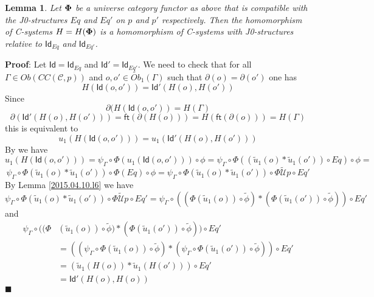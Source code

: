 \documentclass[12pt]{article}
\numberwithin{equation}{section}
\newenvironment{myproof}{{\bf Proof}:}{$\blacksquare$ \vskip 5mm }
\newtheorem{lemma}[proposition]{Lemma}
\newcommand{\wt}{\widetilde}
\newcommand{\toCC}{CC} %
\newcommand{\C}{{\mathcal C}}  %
\newcommand{\ft}{\mathsf{ft}}
\newcommand{\Id}{\mathsf{Id}} %
\newcommand{\U}{\mathcal{U}}
\newcommand{\Obwt}{\wt{Ob}}
\begin{document}
\begin{lemma}
\label{2015.04.12.l1} Let ${\bf\Phi}$ be a universe category functor as above
that is compatible with the J0-structures $Eq$ and $Eq'$ on $p$ and $p'$
respectively. Then the homomorphism of C-systems $H=H({\bf\Phi})$ is a
homomorphism of C-systems with J0-structures relative to $\Id_{Eq}$ and
$\Id_{Eq'}$.
\end{lemma}
%
\begin{myproof}
Let $\Id=\Id_{Eq}$ and $\Id'=\Id_{Eq'}$. We need to check that for all
$\Gamma\in Ob(\toCC({\C},p))$ and $o,o'\in \Obwt_1(\Gamma)$ such that
$\partial(o)=\partial(o')$ one has
%
$$H(\Id(o,o'))=\Id'(H(o),H(o'))$$
%
Since
%
$$\partial(H(\Id(o,o'))=H(\Gamma)$$
%
$$\partial(\Id'(H(o),H(o')))=\ft(\partial(H(o)))=H(\ft(\partial(o)))=H(\Gamma)$$
%
this is equivalent to
%
$$u_1(H(\Id(o,o')))=u_1(\Id'(H(o),H(o')))$$
%
By \cite[Lemma 6.1(1)]{fromunivwithPi} we have
%
$$u_1(H(\Id(o,o')))=\psi_{\Gamma}\circ\Phi(u_1(\Id(o,o')))\circ\phi=\psi_{\Gamma}\circ\Phi((\wt{u}_1(o)*\wt{u}_1(o'))\circ
Eq)\circ\phi=$$
%
$$\psi_{\Gamma}\circ\Phi(\wt{u}_1(o)*\wt{u}_1(o'))\circ
\Phi(Eq)\circ\phi=\psi_{\Gamma}\circ\Phi(\wt{u}_1(o)*\wt{u}_1(o'))\circ
\Phi\wt{\U}p\circ Eq'$$
%
By Lemma \ref{2015.04.10.l6} we have
%
$$\psi_{\Gamma}\circ\Phi(\wt{u}_1(o)*\wt{u}_1(o'))\circ \Phi\wt{\U}p\circ
Eq'=\psi_{\Gamma}\circ((\Phi(\wt{u}_1(o))\circ\wt{\phi})*(\Phi(\wt{u}_1(o'))\circ\wt{\phi}))\circ
Eq'$$
%
and \cite[Lemma 6.1(2)]{fromunivwithPi}
%
\begin{align*}
  \psi_{\Gamma}\circ((\Phi&(\wt{u}_1(o))\circ\wt{\phi})*(\Phi(\wt{u}_1(o'))\circ\wt{\phi}))\circ Eq' \\
    & = ((\psi_{\Gamma}\circ\Phi(\wt{u}_1(o))\circ\wt{\phi})*(\psi_{\Gamma}\circ\Phi(\wt{u}_1(o'))\circ\wt{\phi}))\circ Eq' \\
    & = (\wt{u}_1(H(o))*\wt{u}_1(H(o')))\circ Eq' \\
    & = \Id'(H(o),H(o))
\end{align*}
\end{myproof}
\end{document}
